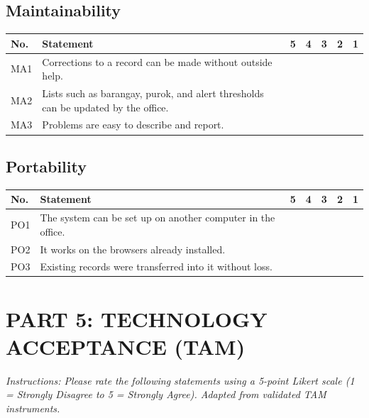 \documentclass[12pt, a4paper]{report}
\begin{document}
\vspace{0.3cm}
\subsection*{Maintainability}
\begin{tabular}{|p{1cm}|p{9cm}|p{0.7cm}|p{0.7cm}|p{0.7cm}|p{0.7cm}|p{0.7cm}|}
\hline
\textbf{No.} & \textbf{Statement} & \textbf{5} & \textbf{4} & \textbf{3} & \textbf{2} & \textbf{1} \\
\hline
MA1 & Corrections to a record can be made without outside help. & & & & & \\
\hline
MA2 & Lists such as barangay, purok, and alert thresholds can be updated by the office. & & & & & \\
\hline
MA3 & Problems are easy to describe and report. & & & & & \\
\hline
\end{tabular}

\vspace{0.3cm}
\subsection*{Portability}
\begin{tabular}{|p{1cm}|p{9cm}|p{0.7cm}|p{0.7cm}|p{0.7cm}|p{0.7cm}|p{0.7cm}|}
\hline
\textbf{No.} & \textbf{Statement} & \textbf{5} & \textbf{4} & \textbf{3} & \textbf{2} & \textbf{1} \\
\hline
PO1 & The system can be set up on another computer in the office. & & & & & \\
\hline
PO2 & It works on the browsers already installed. & & & & & \\
\hline
PO3 & Existing records were transferred into it without loss. & & & & & \\
\hline
\end{tabular}

\vspace{0.5cm}

\section*{PART 5: TECHNOLOGY ACCEPTANCE (TAM)}
\textit{Instructions: Please rate the following statements using a 5-point Likert scale (1 = Strongly Disagree to 5 = Strongly Agree). Adapted from validated TAM instruments.}
\end{document}
